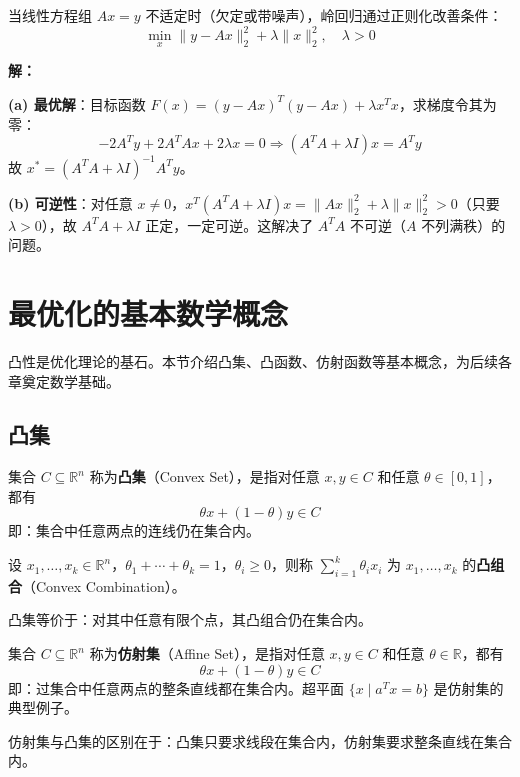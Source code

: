 \begin{example}\label{ex:ridge}
当线性方程组 $Ax = y$ 不适定时（欠定或带噪声），岭回归通过正则化改善条件：
\[
\min_x \|y - Ax\|_2^2 + \lambda \|x\|_2^2, \quad \lambda > 0
\]

\textbf{解：}

\textbf{(a) 最优解}：目标函数 $F(x) = (y - Ax)^T(y - Ax) + \lambda x^T x$，求梯度令其为零：
\[
-2A^T y + 2A^T A x + 2\lambda x = 0 \Rightarrow (A^T A + \lambda I)x = A^T y
\]
故 $x^* = (A^T A + \lambda I)^{-1} A^T y$。

\textbf{(b) 可逆性}：对任意 $x \neq 0$，$x^T(A^T A + \lambda I)x = \|Ax\|_2^2 + \lambda \|x\|_2^2 > 0$（只要 $\lambda > 0$），故 $A^T A + \lambda I$ 正定，一定可逆。这解决了 $A^T A$ 不可逆（$A$ 不列满秩）的问题。
\end{example}

\section{最优化的基本数学概念}\label{sec:math-prelim}

凸性是优化理论的基石。本节介绍凸集、凸函数、仿射函数等基本概念，为后续各章奠定数学基础。

\subsection{凸集}

\begin{definition}[凸集]
集合 $C \subseteq \mathbb{R}^n$ 称为\textbf{凸集}（Convex Set），是指对任意 $x, y \in C$ 和任意 $\theta \in [0,1]$，都有
\[
\theta x + (1-\theta) y \in C
\]
即：集合中任意两点的连线仍在集合内。
\end{definition}

\begin{definition}[凸组合]
设 $x_1, \ldots, x_k \in \mathbb{R}^n$，$\theta_1 + \cdots + \theta_k = 1$，$\theta_i \geq 0$，则称 $\sum_{i=1}^k \theta_i x_i$ 为 $x_1, \ldots, x_k$ 的\textbf{凸组合}（Convex Combination）。

凸集等价于：对其中任意有限个点，其凸组合仍在集合内。
\end{definition}

\begin{definition}[仿射集]
集合 $C \subseteq \mathbb{R}^n$ 称为\textbf{仿射集}（Affine Set），是指对任意 $x, y \in C$ 和任意 $\theta \in \mathbb{R}$，都有
\[
\theta x + (1-\theta) y \in C
\]
即：过集合中任意两点的整条直线都在集合内。超平面 $\{x \mid a^T x = b\}$ 是仿射集的典型例子。

仿射集与凸集的区别在于：凸集只要求线段在集合内，仿射集要求整条直线在集合内。
\end{definition}


